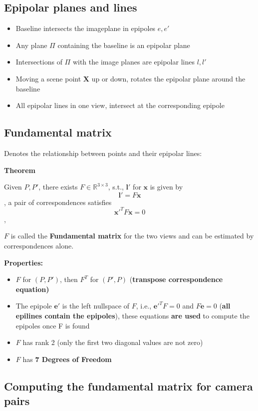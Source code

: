 \subsection{Epipolar planes and lines}

\begin{itemize}
    \item Baseline intersects the imageplane in epipoles $e, e'$
    \item Any plane $\Pi$ containing the baseline is an epipolar plane
    \item Intersections of $\Pi$ with the image planes are epipolar lines $l,l'$
    \item Moving a scene point $\mathbf{X}$ up or down, rotates the epipolar plane around the baseline
    \item All epipolar lines in one view, intersect at the corresponding epipole
\end{itemize}

\subsection{Fundamental matrix}

Denotes the relationship between points and their epipolar lines:

\textbf{Theorem}

Given $P, P'$, there exists $F \in \mathbb{R}^{3\times 3}$, s.t., $\mathbf{l}'$ for $\mathbf{x}$ is given by $$\mathbf{l}' = F \mathbf{x}$$, a pair of correspondences satisfies $$\mathbf{x'}^T F \mathbf{x} = 0$$,

$F$ is called the \textbf{Fundamental matrix} for the two views and can be estimated by correspondences alone.

\textbf{Properties:} \begin{itemize}
    \item $F$ for $(P,P')$, then $F^T$ for $(P',P)$ (\textbf{transpose correspondence equation)}
    \item The epipole $\mathbf{e'}$ is the left nullspace of $F$, i.e., $\mathbf{e'}^T F = 0$ and $F \mathbf{e} = 0$ (\textbf{all epilines contain the epipoles}), these equations \textbf{are used} to compute the epipoles once F is found
    \item $F$ has rank 2 (only the first two diagonal values are not zero)
    \item $F$ has \textbf{7 Degrees of Freedom}
\end{itemize}

\subsection{Computing the fundamental matrix for camera pairs}

